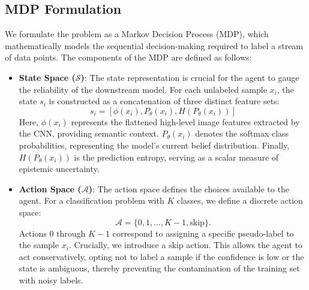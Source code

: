 \documentclass[pdflatex,sn-mathphys-num]{sn-jnl}%
\theoremstyle{thmstyleone}%
\theoremstyle{thmstyletwo}%
\theoremstyle{thmstylethree}%
\begin{document}
\subsection{MDP Formulation}\label{subsec:mdp}

We formulate the problem as a Markov Decision Process (MDP), which mathematically models the sequential decision-making required to label a stream of data points. The components of the MDP are defined as follows:

\begin{itemize}

    \item \textbf{State Space ($\mathcal{S}$)}: The state representation is crucial for the agent to gauge the reliability of the downstream model. For each unlabeled sample $x_i$, the state $s_i$ is constructed as a concatenation of three distinct feature sets:
    \begin{equation}
     s_i = [\phi(x_i), P_\theta(x_i), H(P_\theta(x_i))]
    \end{equation}
    Here, $\phi(x_i)$ represents the flattened high-level image features extracted by the CNN, providing semantic context. $P_\theta(x_i)$ denotes the softmax class probabilities, representing the model's current belief distribution. Finally, $H(P_\theta(x_i))$ is the prediction entropy, serving as a scalar measure of epistemic uncertainty.
    
    \item \textbf{Action Space ($\mathcal{A}$)}: The action space defines the choices available to the agent. For a classification problem with $K$ classes, we define a discrete action space:
    \begin{equation}
    \mathcal{A} = \{0, 1, \ldots, K-1, \text{skip}\}.
    \end{equation}
    Actions $0$ through $K-1$ correspond to assigning a specific pseudo-label to the sample $x_i$. Crucially, we introduce a $\text{skip}$ action. This allows the agent to act conservatively, opting not to label a sample if the confidence is low or the state is ambiguous, thereby preventing the contamination of the training set with noisy labels.
    

\end{itemize}
\end{document}
